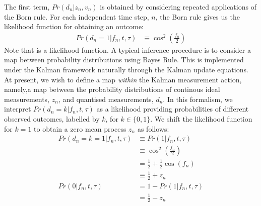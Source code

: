 The first term, $Pr(d_n | z_n, v_n)$ is obtained by considering repeated applications of the Born rule. For each independent time step, $n$, the Born rule gives us the likelihood function for obtaining an outcome:
\begin{align}
Pr(d_n=1 | f_n, t, \tau) & \equiv \cos^2(\frac{f_n}{2}) 
\end{align}
Note that is a likelihood function. A typical inference procedure is to consider a map between probability distributions using Bayes Rule. This is implemented under the Kalman framework naturally through the Kalman update equations. At present, we wish to define a map \emph{within} the Kalman measurement action, namely,a map between the probability distributions of continous ideal measurements, $z_n$, and quantised measurements, $d_n$. In this formalism, we interpret $Pr(d_n=k | f_n, t, \tau)$ as a likelihood providing probabilities of different observed outcomes, labelled by $k$, for $k \in \{0, 1\}$. We shift the likelihood function for $k=1$ to obtain a zero mean process $z_n$ as follows: 
\begin{align} 
Pr(d_n=k=1 | f_n, t, \tau) &\equiv Pr(1 | f_n, t, \tau)\\
 & \equiv \cos^2(\frac{f_n}{2}) \\
& = \frac{1}{2} +  \frac{1}{2}\cos(f_n) \\
& \equiv \frac{1}{2} +  z_n  \\
Pr(0 | f_n, t, \tau) & = 1 - Pr(1 | f_n, t, \tau)\\
& = \frac{1}{2} - z_n \label{eqn:app:bornrule:up}
\end{align}


